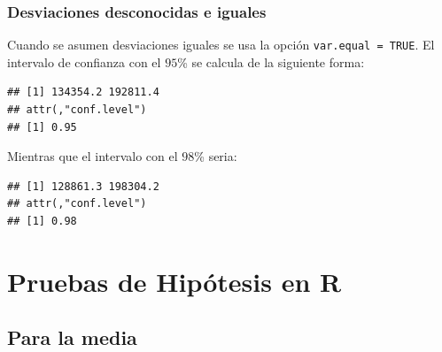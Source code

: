 \documentclass[]{book}
\newenvironment{Shaded}{\begin{snugshade}}{\end{snugshade}}
\newcommand{\DataTypeTok}[1]{\textcolor[rgb]{0.13,0.29,0.53}{#1}}
\newcommand{\FloatTok}[1]{\textcolor[rgb]{0.00,0.00,0.81}{#1}}
\newcommand{\KeywordTok}[1]{\textcolor[rgb]{0.13,0.29,0.53}{\textbf{#1}}}
\newcommand{\NormalTok}[1]{#1}
\newcommand{\OperatorTok}[1]{\textcolor[rgb]{0.81,0.36,0.00}{\textbf{#1}}}
\newcommand{\OtherTok}[1]{\textcolor[rgb]{0.56,0.35,0.01}{#1}}
\begin{document}
\hypertarget{desviaciones-desconocidas-e-iguales-1}{%
\subsubsection{Desviaciones desconocidas e iguales}\label{desviaciones-desconocidas-e-iguales-1}}

Cuando se asumen desviaciones iguales se usa la opción \texttt{var.equal\ =\ TRUE}. El intervalo de confianza con el \(95\)\% se calcula de la siguiente forma:

\begin{Shaded}
\end{Shaded}

\begin{verbatim}
## [1] 134354.2 192811.4
## attr(,"conf.level")
## [1] 0.95
\end{verbatim}

Mientras que el intervalo con el \(98\)\% seria:

\begin{Shaded}
\end{Shaded}

\begin{verbatim}
## [1] 128861.3 198304.2
## attr(,"conf.level")
## [1] 0.98
\end{verbatim}

\hypertarget{pruebas-de-hipotesis-en-r}{%
\section{Pruebas de Hipótesis en R}\label{pruebas-de-hipotesis-en-r}}

\hypertarget{para-la-media-1}{%
\subsection{Para la media}\label{para-la-media-1}}
\end{document}
